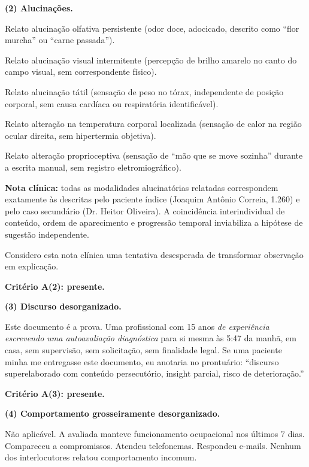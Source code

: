 \noindent \textbf{(2) Alucinações.}

\noindent Relato alucinação olfativa persistente (odor doce,
\noindent adocicado, descrito como ``flor murcha'' ou ``carne passada'').

\noindent Relato alucinação visual intermitente (percepção de
\noindent brilho amarelo no canto do campo visual, sem correspondente físico).

\noindent Relato alucinação tátil (sensação de peso no tórax,
\noindent independente de posição corporal, sem causa cardíaca ou respiratória
\noindent identificável).

\noindent Relato alteração na temperatura corporal localizada
\noindent (sensação de calor na região ocular direita, sem hipertermia objetiva).

\noindent Relato alteração proprioceptiva (sensação de ``mão
\noindent que se move sozinha'' durante a escrita manual, sem registro
\noindent eletromiográfico).

\noindent \textbf{Nota clínica:} todas as modalidades alucinatórias
\noindent relatadas correspondem exatamente às descritas pelo paciente índice
\noindent (Joaquim Antônio Correia, 1.260) e pelo caso secundário (Dr. Heitor
\noindent Oliveira). A coincidência interindividual de conteúdo, ordem de
\noindent aparecimento e progressão temporal inviabiliza a hipótese de
\noindent sugestão independente.

\noindent Considero esta nota clínica uma tentativa desesperada de
\noindent transformar observação em explicação.

\noindent \textbf{Critério A(2): presente.}

\noindent \textbf{(3) Discurso desorganizado.}

\noindent Este documento é a prova. Uma profissional com 15 anos
\noindent \textit{de experiência escrevendo uma autoavaliação diagnóstica }para si mesma
\noindent às 5:47 da manhã, em casa, sem supervisão, sem solicitação, sem
\noindent finalidade legal. Se uma paciente minha me entregasse este documento,
\noindent eu anotaria no prontuário: ``discurso superelaborado com conteúdo
\noindent persecutório, insight parcial, risco de deterioração.''

\noindent \textbf{Critério A(3): presente.}

\noindent \textbf{(4) Comportamento grosseiramente desorganizado.}

\noindent Não aplicável. A avaliada manteve funcionamento
\noindent ocupacional nos últimos 7 dias. Compareceu a compromissos. Atendeu
\noindent telefonemas. Respondeu e-mails. Nenhum dos interlocutores relatou
\noindent comportamento incomum.


